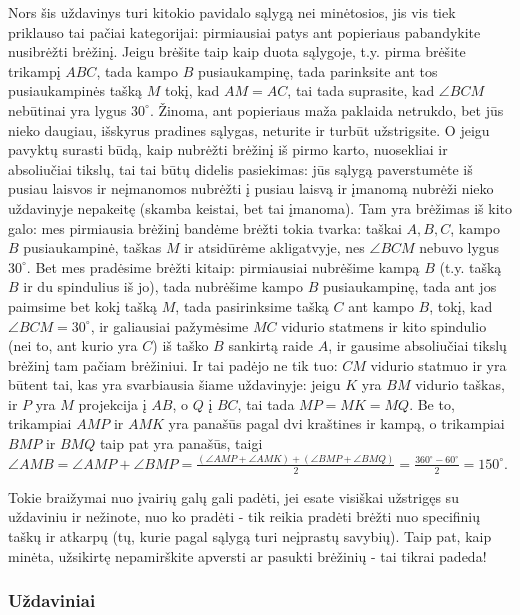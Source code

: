 \begin{sprendimas}
  Nors šis uždavinys turi kitokio pavidalo sąlygą nei minėtosios, jis vis
  tiek priklauso tai pačiai kategorijai: pirmiausiai patys ant popieriaus
  pabandykite nusibrėžti brėžinį. Jeigu brėšite taip kaip duota sąlygoje,
  t.y. pirma brėšite trikampį $ABC$, tada kampo $B$ pusiaukampinę, tada
  parinksite ant tos pusiaukampinės tašką $M$ tokį, kad $AM = AC$, tai tada
  suprasite, kad $\angle BCM$ nebūtinai yra lygus $30^\circ$. Žinoma, ant
  popieriaus maža paklaida netrukdo, bet jūs nieko daugiau, išskyrus
  pradines sąlygas, neturite ir turbūt užstrigsite. O jeigu pavyktų surasti
  būdą, kaip nubrėžti brėžinį iš pirmo karto, nuosekliai ir absoliučiai
  tikslų, tai tai būtų didelis pasiekimas: jūs sąlygą paverstumėte iš
  pusiau laisvos ir neįmanomos nubrėžti į pusiau laisvą ir įmanomą nubrėži
  nieko uždavinyje nepakeitę (skamba keistai, bet tai įmanoma).  Tam yra
  brėžimas iš kito galo: mes pirmiausia brėžinį bandėme brėžti tokia
  tvarka: taškai $A,B,C$, kampo $B$ pusiaukampinė, taškas $M$ ir atsidūrėme
  akligatvyje, nes $\angle BCM$ nebuvo lygus $30^\circ$. Bet mes pradėsime
  brėžti kitaip: pirmiausiai nubrėšime kampą $B$ (t.y. tašką $B$ ir du
  spindulius iš jo), tada nubrėšime kampo $B$ pusiaukampinę, tada ant jos
  paimsime bet kokį tašką $M$, tada pasirinksime tašką $C$ ant kampo $B$,
  tokį, kad $\angle BCM=30^\circ$, ir galiausiai pažymėsime $MC$ vidurio
  statmens ir kito spindulio (nei to, ant kurio yra $C$) iš taško $B$
  sankirtą raide $A$, ir gausime absoliučiai tikslų brėžinį tam pačiam
  brėžiniui. Ir tai padėjo ne tik tuo: $CM$ vidurio statmuo ir yra būtent
  tai, kas yra svarbiausia šiame uždavinyje: jeigu $K$ yra $BM$ vidurio
  taškas, ir $P$ yra $M$ projekcija į $AB$, o $Q$ į $BC$, tai tada $MP = MK
  = MQ$. Be to, trikampiai $AMP$ ir $AMK$ yra panašūs pagal dvi kraštines
  ir kampą, o trikampiai $BMP$ ir $BMQ$ taip pat yra panašūs, taigi $\angle
  AMB = \angle AMP + \angle BMP = \frac{(\angle AMP + \angle AMK) + (\angle
  BMP + \angle BMQ)}{2} = \frac{360^\circ-60^\circ}{2} = 150^\circ$. 
\end{sprendimas}

Tokie braižymai nuo įvairių galų gali padėti, jei esate visiškai užstrigęs
su uždaviniu ir nežinote, nuo ko pradėti - tik reikia pradėti brėžti nuo
specifinių taškų ir atkarpų (tų, kurie pagal sąlygą turi neįprastų
savybių). Taip pat, kaip minėta, užsikirtę nepamirškite apversti ar pasukti
brėžinių - tai tikrai padeda!

\subsubsection{Uždaviniai}

